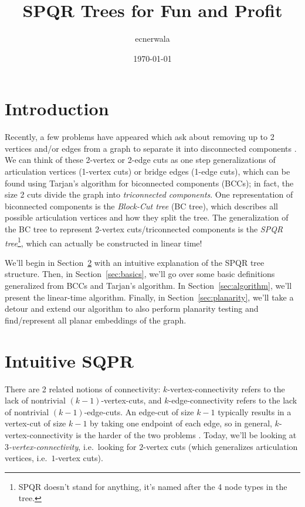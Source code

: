 \documentclass[letterpaper]{article}
\begin{document}
\title{SPQR Trees for Fun and Profit}
\author{ecnerwala}
\date{\today}

\maketitle

\tableofcontents

\section{Introduction}

Recently, a few problems have appeared which ask about removing up to 2 vertices
and/or edges from a graph to separate it into disconnected components
. We can think of these 2-vertex or 2-edge cuts as one step
generalizations of articulation vertices (1-vertex cuts) or bridge edges (1-edge
cuts), which can be found using Tarjan's algorithm for biconnected components
(BCCs); in fact, the size 2 cuts divide the graph into \emph{triconnected components}.
One representation of biconnected components is the \emph{Block-Cut tree} (BC
tree), which describes all possible articulation vertices and how they split the
tree. The generalization of the BC tree to represent 2-vertex cuts/triconnected
components is the \emph{SPQR tree}\footnote{SPQR doesn't stand for anything,
it's named after the 4 node types in the tree.}, which can actually be
constructed in linear time!

We'll begin in Section~\ref{sec:intuitive} with an intuitive explanation of the
SPQR tree structure. Then, in Section~\ref{sec:basics}, we'll go over some basic
definitions generalized from BCCs and Tarjan's algorithm. In
Section~\ref{sec:algorithm}, we'll present the linear-time algorithm. Finally,
in Section~\ref{sec:planarity}, we'll take a detour and extend our algorithm to
also perform planarity testing and find/represent all planar embeddings of the
graph.

\section{Intuitive SQPR}
\label{sec:intuitive}

\begin{note}
There are 2 related notions of connectivity:
$k$-vertex-connectivity refers to the lack of nontrivial $(k-1)$-vertex-cuts,
and $k$-edge-connectivity refers to the lack of nontrivial $(k-1)$-edge-cuts.
An edge-cut of size $k-1$ typically results in a vertex-cut of size $k-1$ by
taking one endpoint of each edge, so in general, $k$-vertex-connectivity is the
harder of the two problems .
Today, we'll be looking at \emph{$3$-vertex-connectivity}, i.e.\ looking for $2$-vertex
cuts (which generalizes articulation vertices, i.e.\ $1$-vertex cuts).
\end{note}
\end{document}
